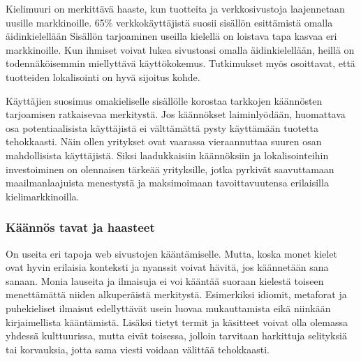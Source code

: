 \documentclass[11pt,a4paper,titlepage,oneside]{article}
\begin{document}
Kielimuuri on merkittävä haaste, kun tuotteita ja verkkosivustoja laajennetaan uusille markkinoille.
65\% verkkokäyttäjistä suosii sisällön esittämistä omalla äidinkielellään 
Sisällön tarjoaminen useilla kielellä on loistava tapa kasvaa eri markkinoille. 
Kun ihmiset voivat lukea sivustoasi omalla äidinkielellään, heillä on todennäköisemmin miellyttävä käyttökokemus.
Tutkimukset myös osoittavat, että tuotteiden lokalisointi on hyvä sijoitus kohde.
\medskip



Käyttäjien suosimus omakieliselle sisällölle korostaa tarkkojen käännösten tarjoamisen ratkaisevaa merkitystä.
Jos käännökset laiminlyödään, huomattava osa potentiaalisista käyttäjistä ei välttämättä pysty käyttämään tuotetta tehokkaasti.
Näin ollen yritykset ovat vaarassa vieraannuttaa suuren osan mahdollisista käyttäjistä.
% 
Siksi laadukkaisiin käännöksiin ja lokalisointeihin investoiminen on olennaisen tärkeää yrityksille,
jotka pyrkivät saavuttamaan maailmanlaajuista menestystä ja maksimoimaan tavoittavuutensa erilaisilla kielimarkkinoilla.
\medskip %









\subsubsection{Käännös tavat ja haasteet}







On useita eri tapoja web sivustojen kääntämiselle.
Mutta, koska monet kielet ovat hyvin erilaisia konteksti ja nyanssit voivat hävitä, jos käännetään sana sanaan.
Monia lauseita ja ilmaisuja ei voi kääntää suoraan kielestä toiseen menettämättä niiden alkuperäistä merkitystä.
Esimerkiksi idiomit, metaforat ja puhekieliset ilmaisut edellyttävät usein luovaa mukauttamista eikä niinkään kirjaimellista kääntämistä. 
Lisäksi tietyt termit ja käsitteet voivat olla olemassa yhdessä kulttuurissa, 
mutta eivät toisessa, jolloin tarvitaan harkittuja selityksiä tai korvauksia, jotta sama viesti voidaan välittää tehokkaasti.
\medskip
\end{document}
